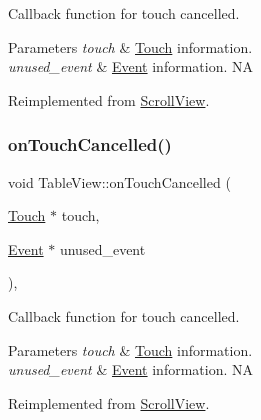 Callback function for touch cancelled.


\begin{DoxyParams}{Parameters}
{\em touch} & \hyperlink{classTouch}{Touch} information. \\
\hline
{\em unused\+\_\+event} & \hyperlink{classEvent}{Event} information.  NA \\
\hline
\end{DoxyParams}


Reimplemented from \hyperlink{classScrollView_a48d7dc926fdbd91707e37167dcf4d36f}{Scroll\+View}.

\mbox{\label{classTableView_a5ed81baf58526698abefaf8ca08a6c01}} 
\subsubsection{\texorpdfstring{on\+Touch\+Cancelled()}{onTouchCancelled()}\hspace{0.1cm}{\footnotesize\ttfamily [2/2]}}
{\footnotesize\ttfamily void Table\+View\+::on\+Touch\+Cancelled (\begin{DoxyParamCaption}\item[{\hyperlink{classTouch}{Touch} $\ast$}]{touch,  }\item[{\hyperlink{classEvent}{Event} $\ast$}]{unused\+\_\+event }\end{DoxyParamCaption})\hspace{0.3cm}{\ttfamily [override]}, {\ttfamily [virtual]}}

Callback function for touch cancelled.


\begin{DoxyParams}{Parameters}
{\em touch} & \hyperlink{classTouch}{Touch} information. \\
\hline
{\em unused\+\_\+event} & \hyperlink{classEvent}{Event} information.  NA \\
\hline
\end{DoxyParams}


Reimplemented from \hyperlink{classScrollView_a48d7dc926fdbd91707e37167dcf4d36f}{Scroll\+View}.

\mbox{\label{classTableView_a361d91c5c592b3d81ed43b6743487fc3}} 
